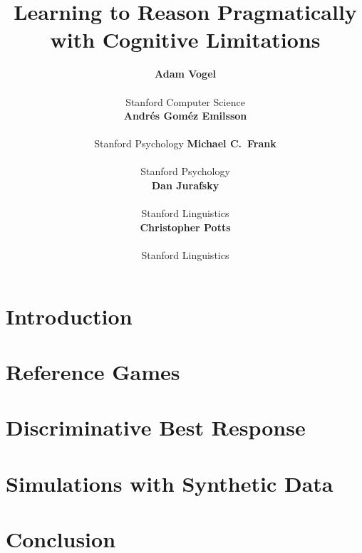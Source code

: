 \documentclass[10pt,letterpaper]{article}
\title{Learning to Reason Pragmatically with Cognitive Limitations}
\author{
  {\large\textbf{Adam Vogel}}\\ 
  \email{acvogel@stanford.edu}\\
  Stanford Computer Science\\
  \And 
  {\large\textbf{Andr{\'e}s Gom{\'e}z Emilsson}}\\
  \email{nc07agom@stanford.edu}\\
  Stanford Psychology
  \And 
  {\large\textbf{Michael C.~Frank}}\\
  \email{mcfrank@stanford.edu}\\
  Stanford Psychology\\
  \AND
  {\large\textbf{Dan Jurafsky}}\\
  \email{jurafsky@stanford.edu}\\
  Stanford Linguistics\\
  \And
  {\large\textbf{Christopher Potts}}\\
  \email{cgpotts@stanford.edu}\\
  Stanford Linguistics\\
}
\begin{document}
\maketitle


\begin{abstract}


\end{abstract}

\section{Introduction}\label{sec:intro}


\section{Reference Games}\label{sec:refgames}


\section{Discriminative Best Response}\label{sec:model}


\section{Simulations with Synthetic Data}




\section{Conclusion}




\setlength{\bibleftmargin}{.125in}
\setlength{\bibindent}{-\bibleftmargin}

\end{document}
